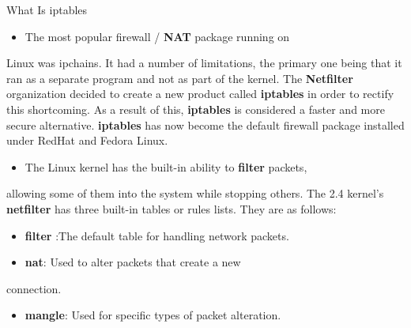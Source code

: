 \begin{frame}[t,allowframebreaks]{What Is iptables}
  \fontsize{15}{18}\selectfont
  \begin{itemize}
    \item The most popular firewall / \textcolor{CommandGreen}{\bfseries NAT} package running on
  \end{itemize}
  Linux was ipchains. It had a number of limitations, the primary one being that it ran as a separate program and not as part of the kernel. The \textcolor{CommandGreen}{\bfseries Netfilter} organization decided to create a new product called \textcolor{CommandGreen}{\bfseries iptables} in order to rectify this shortcoming. As a result of this, \textcolor{CommandGreen}{\bfseries iptables} is considered a faster and more secure alternative. \textcolor{CommandGreen}{\bfseries iptables} has now become the default firewall package installed under RedHat and Fedora Linux.\par
  \begin{itemize}
    \item The Linux kernel has the built-in ability to \textcolor{CommandGreen}{\bfseries filter} packets,
  \end{itemize}
  allowing some of them into the system while stopping others. The 2.4 kernel's \textcolor{CommandGreen}{\bfseries netfilter} has three built-in tables or rules lists. They are as follows:\par
  \begin{itemize}
    \item \textcolor{CommandGreen}{\bfseries filter} :The default table for handling network packets.
    \item \textcolor{CommandGreen}{\bfseries nat}: Used to alter packets that create a new
  \end{itemize}
  connection.\par
  \begin{itemize}
    \item \textcolor{CommandGreen}{\bfseries mangle}: Used for specific types of packet alteration.
  \end{itemize}
\end{frame}
